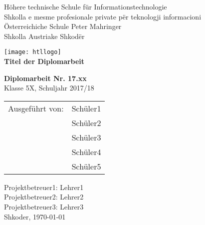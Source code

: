 
\newcommand{\trtitle}{Titel der Diplomarbeit}
\newcommand{\trort}{Shkoder}
\newcommand{\trbetreuer}{Titel Betreuer}
\newcommand{\trdate}{\today}
\newcommand{\trnumber}{17.xx}
\newcommand{\trclass}{5X}
\newcommand{\trschuelereins}{Sch\"uler1}
\newcommand{\trschuelerzwei}{Sch\"uler2}
\newcommand{\trschuelerdrei}{Sch\"uler3}
\newcommand{\trschuelervier}{Sch\"uler4}
\newcommand{\trschuelerfuenf}{Sch\"uler5}
\newcommand{\trsauftraggeber}{Herr Max Mustermann oder Firma}
\newcommand{\trbetreuereins}{Lehrer1}
\newcommand{\trbetreuerzwei}{Lehrer2}
\newcommand{\trbetreuerdrei}{Lehrer3}

\thispagestyle{empty}

\begin{center}
  \large H\"ohere technische Schule f\"ur Informationstechnologie \\
  \large Shkolla e mesme profesionale private p\"er teknologji informacioni \\
  \Huge \"Osterreichiche Schule \glqq Peter Mahringer\grqq \\
  \Large Shkolla Austriake Shkod\"er
\end{center}

\begin{center}
  \texttt{[image: htllogo]} \\
  \textbf{\LARGE \trtitle}
\end{center}
\vspace{1cm}

\begin{flushleft}
\textbf{\LARGE Diplomarbeit Nr. \trnumber} \\
\LARGE Klasse \trclass{}, Schuljahr 2017/18

\begin{table}[htbp]
\Large
\begin{tabular}{cl}
   Ausgef\"uhrt von: & \trschuelereins \\ 
   & \trschuelerzwei \\ 
   & \trschuelerdrei \\ 
   & \trschuelervier \\ 
   & \trschuelerfuenf \\ 
 \end{tabular}
\end{table}
\end{flushleft}


\large Projektbetreuer1: \trbetreuereins \\
\large Projektbetreuer2: \trbetreuerzwei \\
\large Projektbetreuer3: \trbetreuerdrei \\
\newline
\large \trort{}, \today

\vfill